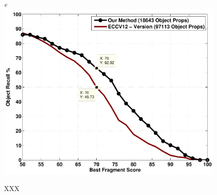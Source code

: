 \begin{figure}[!ht]
{\footnotesize\textit{e}}\includegraphics[width=0.47\linewidth]{figs/current_vs_eccv12.pdf}
\caption{XXX}
\label{fig:growth}
\end{figure}


